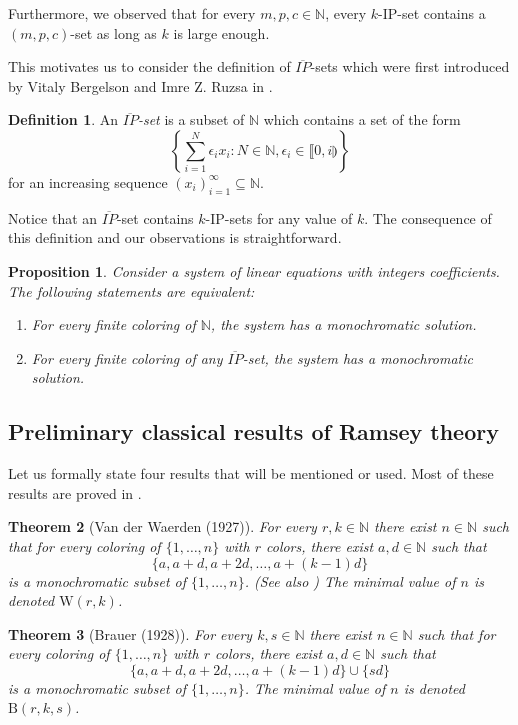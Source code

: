 \documentclass{article}
\theoremstyle{definition}
\newtheorem{definition}{Definition}[section]
\theoremstyle{plain}
\newtheorem{theorem}{Theorem}[section]
\newtheorem{proposition}[theorem]{Proposition}
\theoremstyle{remark}
\newcommand{\N}{\ensuremath{\mathbb{N}}}
\newcommand{\W}{\ensuremath{\mathrm{W}}}
\newcommand{\B}{\ensuremath{\mathrm{B}}}
\newcommand{\seq}[2]{\ensuremath{\left ( {#1}_{#2}\right )_{#2 = 1}^\infty }}
\begin{document}
Furthermore, we observed that for every $m,p,c \in \N$, every $k$-IP-set contains a $(m,p,c)$-set as long as $k$ is large enough.

This motivates us to consider the definition of $\overline{IP}$-sets which were first introduced by Vitaly Bergelson and Imre Z. Ruzsa in \cite{BerRuz09}. 
\begin{definition}
    An \emph{$\overline{IP}$-set} is a subset of $\N$ which contains a set of the form
    $$\left \{ \sum_{i=1}^N \epsilon_i x_i: N \in \N, \epsilon_i \in \llbracket 0,i \rrparenthesis \right\}$$
   for an increasing sequence $\seq{x}{i} \subseteq \N$.
\end{definition}

Notice that an $\overline{IP}$-set contains $k$-IP-sets for any value of $k$. The consequence of this definition and our observations is straightforward.
\begin{proposition}\label{INTRO_consolation}
    Consider a system of linear equations with integers coefficients. The following statements are equivalent:
    \begin{enumerate}
        \item For every finite coloring of $\N$, the system has a monochromatic solution.
        \item For every finite coloring of any $\overline{IP}$-set, the system has a monochromatic solution.
    \end{enumerate}
\end{proposition}

\subsection{Preliminary classical results of Ramsey theory}
Let us formally state four results that will be mentioned or used. Most of these results are proved in \cite{GRS90}.

\begin{theorem}[Van der Waerden (1927)]
    For every $r,k\in \N$ there exist $n\in \N$ such that for every coloring of $\{1,\ldots,n\}$ with $r$ colors, there exist $a,d \in \N$ such that
    $$\{a, a+d, a+2d, \ldots, a + (k-1)d\}$$
    is a monochromatic subset of $\{1,\ldots,n\}$. (See also \cite{vdW28}) The minimal value of $n$ is denoted $\W(r,k)$.
\end{theorem}

\begin{theorem}[Brauer (1928)]
    For every $k,s\in \N$ there exist $n\in \N$ such that for every coloring of $\{1,\ldots,n\}$ with $r$ colors, there exist $a,d \in \N$ such that
    $$\{a, a+d, a+2d, \ldots, a + (k-1)d\} \cup \{sd\}$$
    is a monochromatic subset of $\{1,\ldots,n\}$. The minimal value of $n$ is denoted $\B(r,k,s)$.
\end{theorem}
\end{document}
